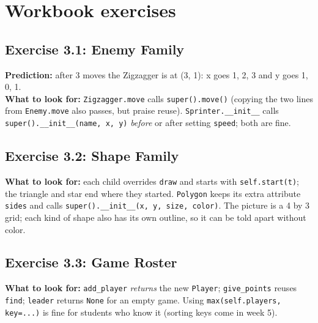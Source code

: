 
\section{Workbook exercises}
\subsection{Exercise 3.1: Enemy Family}
\begin{answer}
\textbf{Prediction:} after 3 moves the Zigzagger is at (3, 1): x goes 1, 2, 3 and y goes 1, 0, 1.\\
\textbf{What to look for:} \texttt{Zigzagger.move} calls \texttt{super().move()} (copying the two lines from \texttt{Enemy.move} also passes, but praise reuse).
\texttt{Sprinter.\_\_init\_\_} calls \texttt{super().\_\_init\_\_(name, x, y)} \emph{before} or after setting \texttt{speed}; both are fine.
\end{answer}

\subsection{Exercise 3.2: Shape Family}
\begin{answer}
\textbf{What to look for:} each child overrides \texttt{draw} and starts with \texttt{self.start(t)}; the triangle and star end where they started.
\texttt{Polygon} keeps its extra attribute \texttt{sides} and calls \texttt{super().\_\_init\_\_(x, y, size, color)}. The picture is a 4 by 3 grid; each kind of shape also has its own outline, so it can be told apart without color.
\end{answer}

\subsection{Exercise 3.3: Game Roster}
\begin{answer}
\textbf{What to look for:} \texttt{add\_player} \emph{returns} the new \texttt{Player}; \texttt{give\_points} reuses \texttt{find}; \texttt{leader} returns \texttt{None} for an empty game.
Using \texttt{max(self.players, key=...)} is fine for students who know it (sorting keys come in week 5).
\end{answer}


